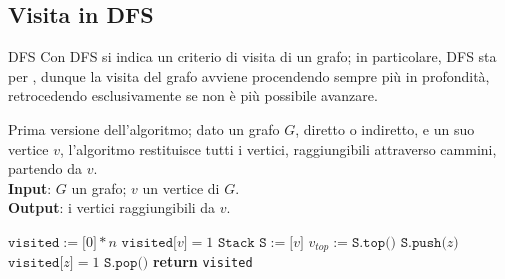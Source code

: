 \documentclass[a4paper, 12pt]{report}
\begin{document}
    \subsection{Visita in DFS}

    \begin{frameddefn}{DFS}
        Con DFS si indica un criterio di visita di un grafo; in particolare, DFS sta per , dunque la visita del grafo avviene procendendo sempre più in profondità, retrocedendo esclusivamente se non è più possibile avanzare.
    \end{frameddefn}

    \begin{algorithm}[H]
        \caption{
            Prima versione dell'algoritmo; dato un grafo $G$, diretto o indiretto, e un suo vertice $v$, l'algoritmo restituisce tutti i vertici, raggiungibili attraverso cammini, partendo da $v$.\\
            \textbf{Input}: $G$ un grafo; $v$ un vertice di $G$.\\
            \textbf{Output}: i vertici raggiungibili da $v$.
        }

        \begin{algorithmic}[1]
                \State $\texttt{visited}:=\texttt{[}0\texttt{]} * n$ 
                \State $\texttt{visited[}v\texttt{]} = 1$
                \State $\texttt{Stack S}:=\texttt{[}v\texttt{]}$
                    \State $v_{top}:=\texttt{S.top()}$
                        \State $\texttt{S.push(}z\texttt{)}$
                        \State $\texttt{visited[}z\texttt{]} = 1$
                    \Else
                        \State $\texttt{S.pop()}$
                    \EndIf
                \EndWhile
                \State \textbf{return} \texttt{visited}
            \EndFunction
        \end{algorithmic}
    \end{algorithm}
\end{document}
